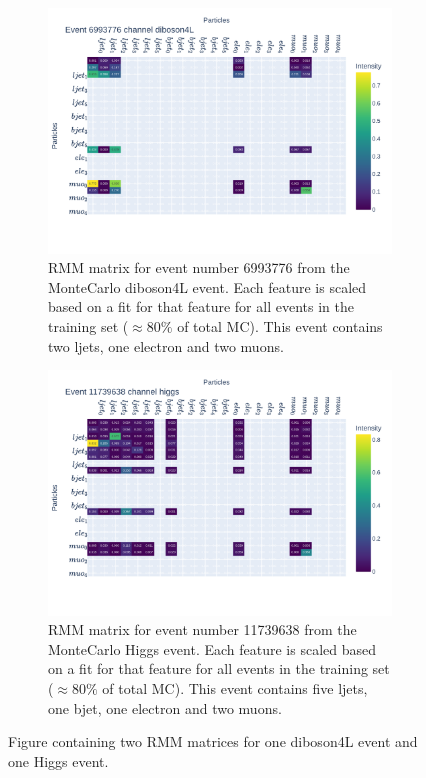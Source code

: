 \begin{figure}[H]
    \centering
    \begin{subfigure}{.8\textwidth}
        \includegraphics[width=\textwidth]{Figures/rmms/rmm_event_6993776_diboson4L.pdf}
        \caption{RMM matrix for event number 6993776 from the MonteCarlo diboson4L event. Each feature is scaled based on a fit for that feature for 
        all events in the training set ($\approx 80\%$ of total MC). This event contains two ljets, one electron and two muons.}
        \label{fig:rmm_zee_event}
    \end{subfigure}
    \hfill
    \begin{subfigure}{.8\textwidth}
        \includegraphics[width=\textwidth]{Figures/rmms/rmm_event_11739638_higgs.pdf}
        \caption{ RMM matrix for event number 11739638 from the MonteCarlo Higgs event. Each feature is scaled based on a fit for that feature for 
        all events in the training set ($\approx 80\%$ of total MC). This event contains five ljets, one bjet, one electron and two muons. }
        \label{fig:rmm_higgs_event}
    \end{subfigure}
    \hfill        
    \caption[Single event RMM plot]{Figure containing two RMM matrices for one diboson4L event and one Higgs event.}
    \label{fig:rmm_singular_events}
\end{figure}

